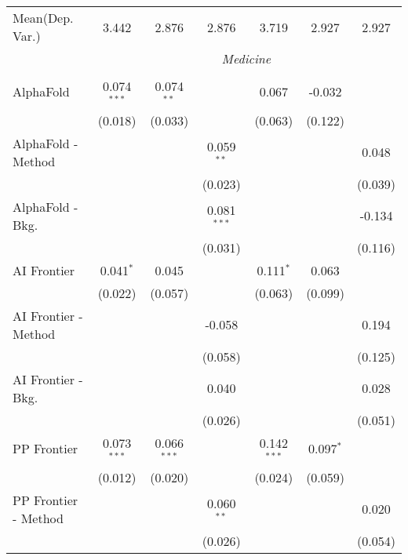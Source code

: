 \begin{tabular}{lcccccc}
Mean(Dep. Var.) & 3.442 & 2.876 & 2.876 & 3.719 & 2.927 & 2.927 \\
 & \multicolumn{6}{c}{\textit{Medicine}} \\ \\
   AlphaFold            & 0.074$^{***}$ & 0.074$^{**}$  &               & 0.067         & -0.032      &   \\   
                        & (0.018)       & (0.033)       &               & (0.063)       & (0.122)     &   \\   
   AlphaFold - Method   &               &               & 0.059$^{**}$  &               &             & 0.048\\   
                        &               &               & (0.023)       &               &             & (0.039)\\   
   AlphaFold - Bkg.     &               &               & 0.081$^{***}$ &               &             & -0.134\\   
                        &               &               & (0.031)       &               &             & (0.116)\\   
   AI Frontier          & 0.041$^{*}$   & 0.045         &               & 0.111$^{*}$   & 0.063       &   \\   
                        & (0.022)       & (0.057)       &               & (0.063)       & (0.099)     &   \\   
   AI Frontier - Method &               &               & -0.058        &               &             & 0.194\\   
                        &               &               & (0.058)       &               &             & (0.125)\\   
   AI Frontier - Bkg.   &               &               & 0.040         &               &             & 0.028\\   
                        &               &               & (0.026)       &               &             & (0.051)\\   
   PP Frontier          & 0.073$^{***}$ & 0.066$^{***}$ &               & 0.142$^{***}$ & 0.097$^{*}$ &   \\   
                        & (0.012)       & (0.020)       &               & (0.024)       & (0.059)     &   \\   
   PP Frontier - Method &               &               & 0.060$^{**}$  &               &             & 0.020\\   
                        &               &               & (0.026)       &               &             & (0.054)\\   

\end{tabular}
